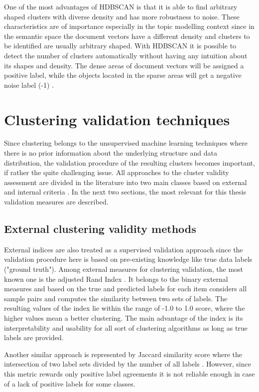 \documentclass[fontsize=12pt,a4paper,twoside,openany]{scrbook}
\begin{document}
One of the most advantages of HDBSCAN is that it is able to find arbitrary shaped clusters with diverse density and has more robustness to noise. These characteristics are of importance especially in the topic modelling context since in the semantic space the document vectors have a different density \parencite{Angelov20} and clusters to be identified are usually arbitrary shaped. With HDBSCAN it is possible to detect the number of clusters automatically without having any intuition about its shapes and density. The dense areas of document vectors will be assigned a positive label, while the objects located in the sparse areas will get a negative noise label (-1) \parencite{Angelov20}.

\section{Clustering validation techniques}
\label{sec:validation}
Since clustering belongs to the unsupervised machine learning techniques where there is no prior information about the underlying structure and data distribution, the validation procedure of the resulting clusters becomes important, if rather the quite challenging issue. All approaches to the cluster validity assessment are divided in the literature into two main classes based on external and internal criteria \parencite{Halkidi01a}. In the next two sections, the most relevant for this thesis validation measures are described.

\subsection{External clustering validity methods}
External indices are also treated as a supervised validation approach \parencite{Palacio19} since the validation procedure here is based on pre-existing knowledge like true data labels ("ground truth"). 
Among external measures for clustering validation, the most known one is the adjusted Rand Index \parencite{Hubert85}. It belongs to the binary external measures \parencite{Handl05} and based on the true and predicted labels for each item considers all sample pairs and computes the similarity between two sets of labels. The resulting values of the index lie within the range of -1.0 to 1.0 score, where the higher values mean a better clustering. The main advantage of the index is its interpretability and usability for all sort of clustering algorithms as long as true labels are provided. 

Another similar approach is represented by Jaccard similarity score where the intersection of two label sets divided by the number of all labels \parencite{Arnaboldi15}. However, since this metric rewards only positive label agreements \parencite{Handl05} it is not reliable enough in case of a lack of positive labels for some classes.
\end{document}
